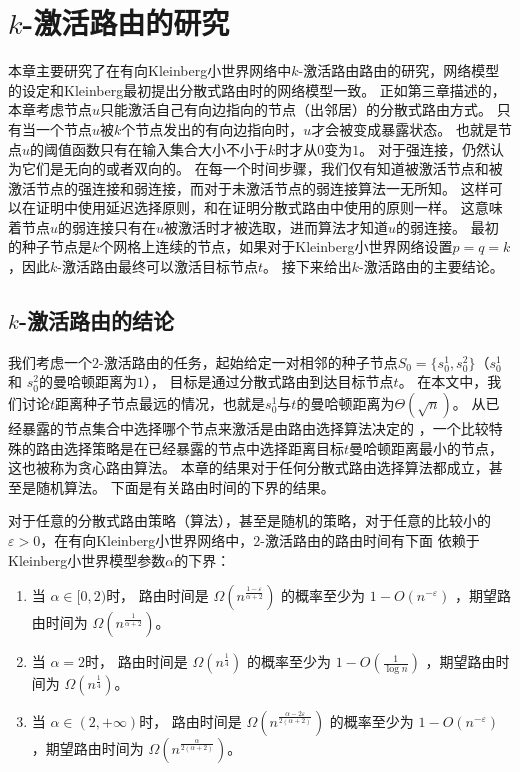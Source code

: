 \chapter{$k$-激活路由的研究}

\def \doubleto {\stackrel{ \geq 2}{\longrightarrow}}

本章主要研究了在有向Kleinberg小世界网络中$k$-激活路由路由的研究，网络模型的设定和Kleinberg最初提出分散式路由时的网络模型一致\cite{Kleinberg2000small}。
正如第三章描述的，本章考虑节点$u$只能激活自己有向边指向的节点（出邻居）的分散式路由方式。
只有当一个节点$u$被$k$个节点发出的有向边指向时，$u$才会被变成暴露状态。
也就是节点$u$的阈值函数只有在输入集合大小不小于$k$时才从$0$变为$1$。
对于强连接，仍然认为它们是无向的或者双向的。
在每一个时间步骤，我们仅有知道被激活节点和被激活节点的强连接和弱连接，而对于未激活节点的弱连接算法一无所知。
这样可以在证明中使用延迟选择原则\cite{Motwani1995randomized}，和\cite{Kleinberg2000small}在证明分散式路由中使用的原则一样。
这意味着节点$u$的弱连接只有在$u$被激活时才被选取，进而算法才知道$u$的弱连接。
最初的种子节点是$k$个网格上连续的节点，如果对于Kleinberg小世界网络设置$p = q = k$，因此$k$-激活路由最终可以激活目标节点$t$。
接下来给出$k$-激活路由的主要结论。

\section{$k$-激活路由的结论} \label{sec:routing}

我们考虑一个$2$-激活路由的任务，起始给定一对相邻的种子节点$S_0 = \{s_0^1, s_0^2\}$（$s_0^1$ 和 $s_0^2$的曼哈顿距离为$1$），
目标是通过分散式路由到达目标节点$t$。
在本文中，我们讨论$t$距离种子节点最远的情况，也就是$s_0^1$与$t$的曼哈顿距离为$\Theta(\sqrt{n})$。
从已经暴露的节点集合中选择哪个节点来激活是由路由选择算法决定的
，一个比较特殊的路由选择策略是在已经暴露的节点中选择距离目标$t$曼哈顿距离最小的节点，这也被称为贪心路由算法。
本章的结果对于任何分散式路由选择算法都成立，甚至是随机算法。
下面是有关路由时间的下界的结果。



\begin{theorem}\label{thm:routing}
对于任意的分散式路由策略（算法），甚至是随机的策略，对于任意的比较小的$\varepsilon > 0$，在有向Kleinberg小世界网络中，$2$-激活路由的路由时间有下面
依赖于Kleinberg小世界模型参数$\alpha$的下界：


\begin{enumerate}
\item
当 $\alpha\in [0,2)$时， 路由时间是 $\Omega( n^{\frac{1-\varepsilon}{\alpha + 2}})$ 的概率至少为 $1-O(n^{-\varepsilon})$ 
，期望路由时间为 $\Omega( n^{\frac{1}{\alpha + 2}})$。
\item
当 $\alpha = 2$时， 路由时间是 $\Omega(n^{\frac{1}{4}})$ 的概率至少为 $1-O(\frac{1}{\log n})$ 
，期望路由时间为 $\Omega(n^{\frac{1}{4}})$。
\item
当 $\alpha\in (2,+\infty)$时， 路由时间是 $\Omega( n^{\frac{\alpha-2\varepsilon}{2(\alpha+2)}})$ 的概率至少为 $1-O(n^{-\varepsilon})$ 
，期望路由时间为 $\Omega( n^{\frac{\alpha}{2(\alpha+2)}})$。

\end{enumerate}
\end{theorem}

